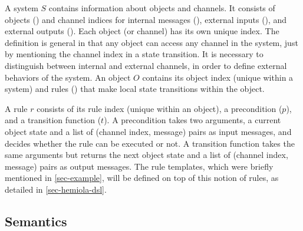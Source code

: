 \documentclass[sigplan,10pt,review,anonymous,screen]{acmart}\settopmatter{printfolios=true,printccs=false,printacmref=false}
\begin{document}
A system $S$ contains information about objects and channels.
It consists of objects () and channel indices for internal messages (), external inputs (), and external outputs ().
Each object (or channel) has its own unique index.
The definition is general in that any object can access any channel in the system, just by mentioning the channel index in a state transition.
It is necessary to distinguish between internal and external channels, in order to define external behaviors of the system.
An object $O$ contains its object index (unique within a system) and rules () that make local state transitions within the object.

A rule $r$ consists of its rule index (unique within an object), a precondition ($p$), and a transition function ($t$).
A precondition takes two arguments, a current object state and a list of (channel index, message) pairs as input messages, and decides whether the rule can be executed or not.
A transition function takes the same arguments but returns the next object state and a list of (channel index, message) pairs as output messages.
The rule templates, which were briefly mentioned in \autoref{sec-example}, will be defined on top of this notion of rules, as detailed in \autoref{sec-hemiola-dsl}.

\subsection{Semantics}
\label{sec-semantics}
\end{document}
